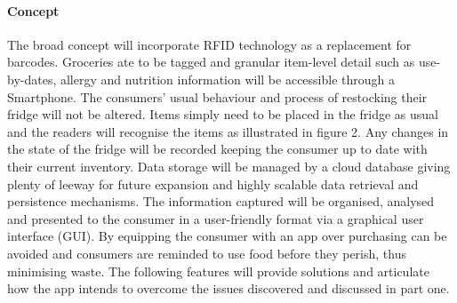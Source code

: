 \documentclass[a4paper, 11pt]{article}
\begin{document}
\paragraph{Concept}The broad concept will incorporate RFID technology as a replacement for barcodes. Groceries ate to be tagged and granular item-level detail such as use-by-dates, allergy and nutrition information will be accessible through a Smartphone. The consumers' usual behaviour and process of restocking their fridge will not be altered. Items simply need to be placed in the fridge as usual and the readers will recognise the items as illustrated in figure 2. Any changes in the state of the fridge will be recorded keeping the consumer up to date with their current inventory. Data storage will be managed by a cloud database giving plenty of leeway for future expansion and highly scalable data retrieval and persistence mechanisms. The information captured will be organised, analysed and presented to the consumer in a user-friendly format via a graphical user interface (GUI). By equipping the consumer with an app over purchasing can be avoided and consumers are reminded to use food before they perish, thus minimising waste. The following features will provide solutions and articulate how the app intends to overcome the issues discovered and discussed in part one.

\vspace{\baselineskip}
\end{document}
